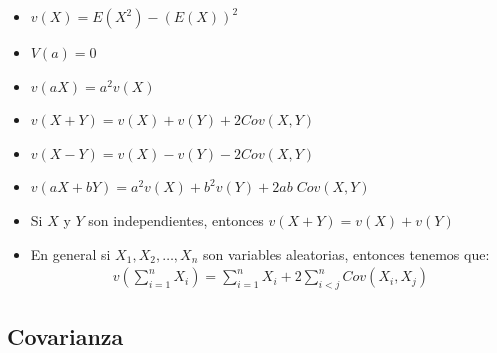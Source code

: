 \documentclass[12pt, fleqn]{report}                             %
\theoremstyle{break}                                            %
\newcommand{\Wrap}[1]           {\left( #1 \right)}             %
\begin{document}
                    \begin{itemize}

                        \item
                            $v(X) = E(X^2) - (E(X))^2$

                        \item 
                            $V(a) = 0$

                        \item 
                            $v(aX) = a^2 v(X)$


                        \item 
                            $v(X + Y) = v(X) + v(Y) + 2Cov(X,Y)$

                        \item 
                            $v(X - Y) = v(X) - v(Y) - 2Cov(X,Y)$

                        \item 
                            $v(aX + bY) = a^2v(X) + b^2v(Y) + 2ab \; Cov(X,Y)$


                        \item
                            Si $X$ y $Y$ son independientes, entonces $v(X + Y) = v(X) + v(Y)$


                        \item
                            En general si $X_1, X_2, \dots, X_n$ son variables aleatorias, entonces
                            tenemos que:
                            \begin{align*}
                                v\Wrap{\sum_{i = 1}^n X_i} = \sum_{i = 1}^n X_i + 2\sum_{i < j}^n Cov(X_i, X_j)
                            \end{align*}

                    \end{itemize}
                                


            \clearpage
            \subsection{Covarianza}

\end{document}
